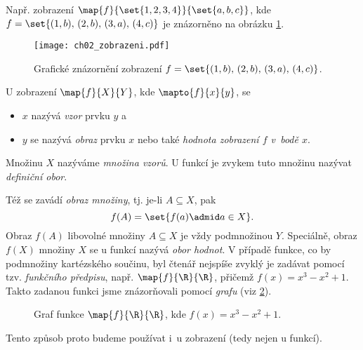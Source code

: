Např. zobrazení $\map{f}{\set{1,2,3,4}}{\set{a,b,c}}$, kde $f=\set{(1,b),\,(2,b),\,(3,a),\,(4,c)}$ je znázorněno na obrázku \ref{fig:zobrazeni}.
\begin{figure}[H]
    \centering
    \texttt{[image: ch02\_zobrazeni.pdf]}
    \caption{Grafické znázornění zobrazení $f=\set{(1,b),\,(2,b),\,(3,a),\,(4,c)}$.}
    \label{fig:zobrazeni}
\end{figure}
U zobrazení $\map{f}{X}{Y}$, kde $\mapto{f}{x}{y}$, se
\begin{itemize}
    \item $x$ nazývá \emph{vzor} prvku $y$ a
    \item $y$ se nazývá \emph{obraz} prvku $x$ nebo také \emph{hodnota zobrazení $f$ v~bodě $x$}.
\end{itemize}
Množinu $X$ nazýváme \emph{množina vzorů}. U funkcí je zvykem tuto množinu nazývat \emph{definiční obor}.\par
Též se zavádí \emph{obraz množiny}, tj. je-li $A\subseteq X$, pak
\begin{equation*}
    f(A)=\set{f(a) \admid a\in X}.
\end{equation*}
Obraz $f(A)$ libovolné množiny $A\subseteq X$ je vždy podmnožinou $Y$. Speciálně, obraz $f(X)$ množiny $X$ se u funkcí nazývá \emph{obor hodnot}.  
V případě funkce, co by podmnožiny kartézského součinu, byl čtenář nejspíše zvyklý je zadávat pomocí tzv. \emph{funkčního předpisu}, např. $\map{f}{\R}{\R}$, přičemž $f(x)=x^3-x^2+1$. Takto zadanou funkci jsme znázorňovali pomocí \emph{grafu} (viz \ref{fig:funkce_graf}).
\begin{figure}[H]
    \centering
    
    \caption{Graf funkce $\map{f}{\R}{\R}$, kde $f(x)=x^3-x^2+1$.}
    \label{fig:funkce_graf}
\end{figure}
Tento způsob proto budeme používat i~u zobrazení (tedy nejen u funkcí).

